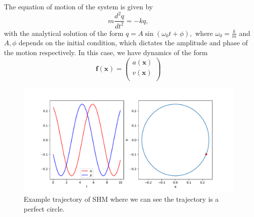 \documentclass{statsmsc}
\begin{document}
The equation of motion of the system is given by $$m\frac{d^2q}{dt^2}=-kq,$$
with the analytical solution of the form $q=A\sin(\omega_0t+\phi),$ where $\omega_0=\frac{k}{m}$ and $A, \phi$ depends on the initial condition, which dictates the amplitude and phase of the motion respectively. 
In this case, we have dynamics of the form 
$$
\mathbf{f}(\mathbf{x})=\begin{pmatrix}
    a(\mathbf{x})\\
    v(\mathbf{x})\\
\end{pmatrix}
$$

\begin{figure}[H] 
  \includegraphics[width=0.7\linewidth]{../codes/figures/shm_trajectory_1D.pdf}
  \centering
  \caption{Example trajectory of SHM where we can see the trajectory is a perfect circle.}
  \label{fig:shm_trajectory}
\end{figure}
\end{document}
